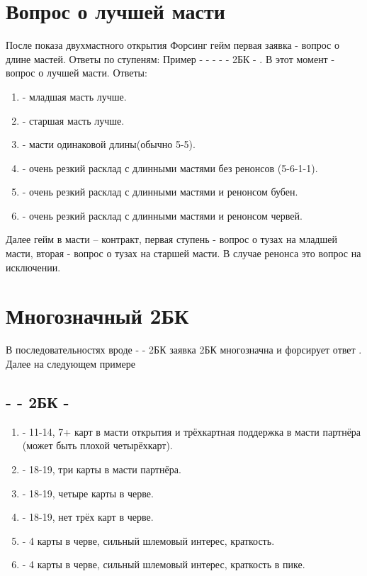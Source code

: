 \documentclass{article}
\begin{document}
\section{Вопрос о лучшей масти}
После показа двухмастного открытия Форсинг гейм первая заявка - вопрос о длине мастей. Ответы по ступеням: Пример  -  -  -  -  - 2БК - . В этот момент  - вопрос о лучшей масти. Ответы:
\begin{enumerate}
    \item[\he{3}] - младшая масть лучше.
    \item[\sp{3}] - старшая масть лучше.
    \item[3БК] - масти одинаковой длины(обычно 5-5).
    \item[\cl{4}] - очень резкий расклад с длинными мастями без ренонсов (5-6-1-1).
    \item[\di{4}] - очень резкий расклад с длинными мастями и ренонсом бубен.
    \item[\he{4}] - очень резкий расклад с длинными мастями и ренонсом червей.
\end{enumerate}
Далее гейм в масти -- контракт, первая ступень - вопрос о тузах на младшей масти, вторая - вопрос о тузах на старшей масти. В случае ренонса это вопрос на исключении.
\section{Многозначный 2БК}
В последовательностях вроде  -  - 2БК заявка 2БК многозначна и форсирует ответ . Далее на следующем примере
\subsection{ -  - 2БК - }
\begin{enumerate}
    \item[\di{3}] - 11-14, 7+ карт в масти открытия и трёхкартная поддержка в масти партнёра (может быть плохой четырёхкарт).
    \item[\he{3}] - 18-19, три карты в масти партнёра.
    \item[\sp{3}] - 18-19, четыре карты в черве.
    \item[3БК] - 18-19, нет трёх карт в черве.
    \item[\cl{4}, \di{4}] - 4 карты в черве, сильный шлемовый интерес, краткость.
    \item[\he{4}] - 4 карты в черве, сильный шлемовый интерес, краткость в пике.
\end{enumerate}
\end{document}
